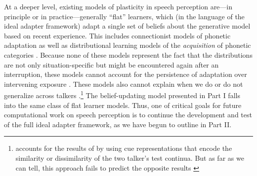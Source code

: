 At a deeper level, existing models of plasticity in speech perception are---in principle or in practice---generally ``flat'' learners, which (in the language of the ideal adapter framework) adapt a single set of beliefs about the generative model based on recent experience.  This includes connectionist models of phonetic adaptation \autocite{Lancia2013,Mirman2006} as well as distributional learning models of the \emph{acquisition} of phonetic categories \autocite[e.g.][]{Feldman2013a,McMurray2009,Vallabha2007}.  Because none of these models represent the fact that the distributions \autocite[or connection weights from input to output units in][]{Lancia2013,Mirman2006} are not only situation-specific but might be encountered again after an interruption, these models cannot account for the persistence of adaptation over intervening exposure \autocite[as in][]{Eisner2006,Kraljic2005}.  These models also cannot explain when we do or do not generalize across talkers \autocite{Kraljic2005,Kraljic2006,Kraljic2007}.\footnote{\textcite{Mirman2006} accounts for the results of \textcite{Kraljic2005,Kraljic2006} by using cue representations that encode the similarity or dissimilarity of the two talker's test continua.  But as far as we can tell, this approach fails to predict the opposite results \autocite{Munson2011,Reinisch2014}}  The belief-updating model presented in Part I falls into the same class of flat learner models.  Thus, one of critical goals for future computational work on speech perception is to continue the development and test of the full ideal adapter framework, as we have begun to outline in Part II.


